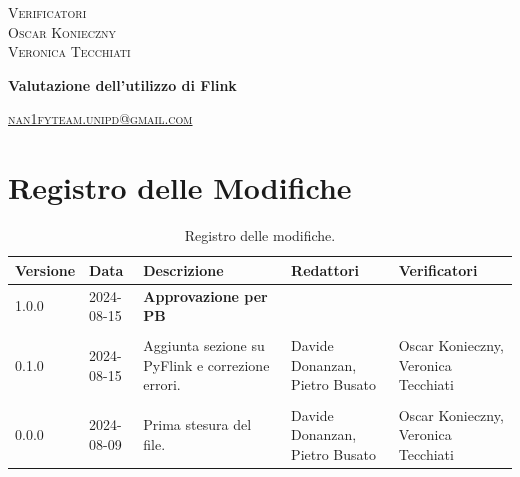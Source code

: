 \documentclass[8pt]{article}
\begin{document}
\begin{titlepage}
\begin{minipage}[t]{0.47\textwidth}
{		}
		\vspace{8mm}
		
		{\large{\textsc{Verificatori}}
			\vspace{3mm}
			{\\\large{\textsc{Oscar Konieczny}\\}}  %
			{\large{\textsc{Veronica Tecchiati}}}
			
		}
		\vspace{4mm}\vspace{4mm}
	\end{minipage}
	\vspace{4cm}
	\begin{center}
		\begin{flushright}
			{\fontsize{30pt}{52pt}\selectfont \textbf{Valutazione dell'utilizzo di Flink\\}} %
		\end{flushright}
		\vspace{3cm}
	\end{center}
	\vspace{9.5cm}
	{\small \textsc{\href{mailto: nan1fyteam.unipd@gmail.com}{nan1fyteam.unipd@gmail.com}}}
\end{titlepage}
\pagestyle{mystyle}
\section*{Registro delle Modifiche}
\begin{table}[ht!]
\hypersetup{hidelinks}
	\centering
	\begin{tabular}{p{1.2cm} p{2cm} p{4cm} p{4cm} p{3cm}}
		\toprule
		\textbf{Versione} & \textbf{Data} & \textbf{Descrizione} & \textbf{Redattori} & \textbf{Verificatori} \\
		\midrule
		  1.0.0 & 2024-08-15 & \textbf{Approvazione per PB} & & \\\\
			0.1.0 & 2024-08-15 & Aggiunta sezione su PyFlink e correzione errori. & Davide Donanzan, Pietro Busato & Oscar Konieczny, Veronica Tecchiati \\\\
      0.0.0 & 2024-08-09 & Prima stesura del file. & Davide Donanzan, Pietro Busato & Oscar Konieczny, Veronica Tecchiati \\
		\bottomrule
	\end{tabular}
	\caption{Registro delle modifiche.}\label{table:Registro delle modifiche}
\end{table}
\newpage
\tableofcontents
\clearpage
\newpage
\justifying
\end{document}
